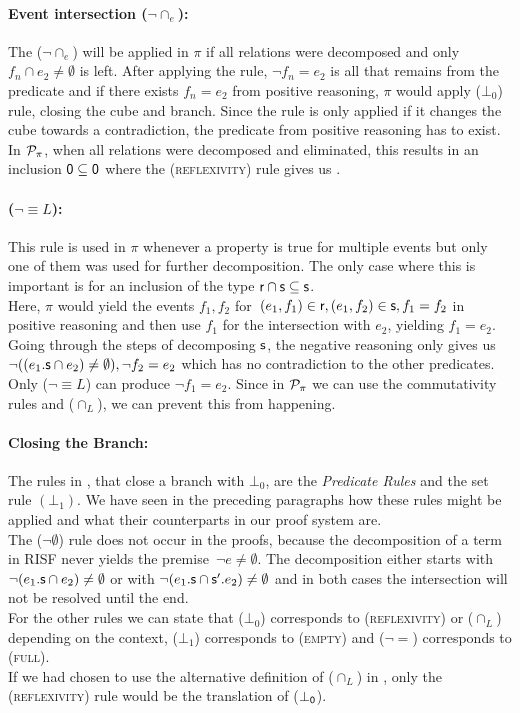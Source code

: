 \documentclass[a4paper,twoside,12pt, english]{article}
\begin{document}
\paragraph{Event intersection ($\neg \cap_e$):} The ($\neg \cap_e$) will be applied in $\pi$ if all relations were decomposed and only $f_n \cap e_2 \neq \emptyset$ is left. After applying the rule, $\neg f_n = e_2$ is all that remains from the predicate and if there exists $f_n = e_2$ from positive reasoning, $\pi$ would apply ($\bot_0$) rule, closing the cube and branch. Since the rule is only applied if it changes the cube towards a contradiction, the predicate from positive reasoning has to exist.
In $\mathcal{P}_\pi$, when all relations were decomposed and eliminated, this results in an inclusion $\textsf{\upshape 0} \subseteq \textsf{\upshape 0}$ where the (\textsc{reflexivity}) rule gives us \true. 

\paragraph{($\neg {\equiv} L$):} This rule is used in $\pi$ whenever a property is true for multiple events but only one of them was used for further decomposition. 
The only case where this is important is for an inclusion of the type $\textsf{\upshape r} \cap \textsf{\upshape s} \subseteq \textsf{\upshape s}$. \\
Here, $\pi$ would yield the events $f_1,f_2$ for~$(e_1,f_1) \in \textsf{\upshape r}, (e_1,f_2) \in \textsf{\upshape s}, f_1 = f_2$ in positive reasoning and then use $f_1$ for the intersection with $e_2$, yielding $f_1 = e_2$. 
Going through the steps of decomposing $\textsf{\upshape s}$, the negative reasoning only gives us $\neg ((e_1.\textsf{\upshape s} \cap e_2) \neq \emptyset), \neg f_2 = e_2$ which has no contradiction to the other predicates.\\ Only ($\neg {\equiv} L$) can produce $\neg f_1 = e_2$.
Since in $\mathcal{P}_\pi$ we can use the commutativity rules and ($\cap_L$), we can prevent this from happening.

\paragraph{Closing the Branch:}
The rules in \cite{Gru+26}, that close a branch with $\bot_0$, are the \textit{Predicate Rules} and the set rule $(\bot_1)$. We have seen in the preceding paragraphs how these rules might be applied and what their counterparts in our proof system are. \\
The ($\neg \emptyset$) rule does not occur in the proofs, because the decomposition of a term in RISF never yields the premise~$\neg e \neq \emptyset$. The decomposition either starts with $\neg (e_1.\textsf{\upshape s} \cap e_2) \neq \emptyset$ or with $\neg (e_1.\textsf{\upshape s} \cap \textsf{\upshape s}'.e_2) \neq \emptyset$ and in both cases the intersection will not be resolved until the end. \\
For the other rules we can state that ($\bot_0$) corresponds to (\textsc{reflexivity}) or ($\cap_L$) depending on the context, ($\bot_1$) corresponds to (\textsc{empty}) and ($\neg =$) corresponds to (\textsc{full}). \\
If we had chosen to use the alternative definition of ($\cap_L$) in , only the (\textsc{reflexivity}) rule would be the translation of ($\bot_{\textsf{\upshape 0}}$).
\end{document}
